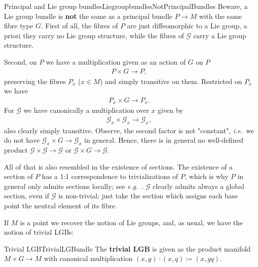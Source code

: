 \documentclass[reqno,a4paper,oneside]{amsart}
\newcounter{access}
\theoremstyle{plain}
\theoremstyle{remark}
\theoremstyle{definition}
\begin{document}
\ifnum{}
\begin{remarks}{Principal and Lie group bundles}{LiegroupbundlesNotPrincipalBundles}
Beware, a Lie group bundle is \textbf{not} the same as a principal bundle $P \to M$ with the same fibre type $G$. First of all, the fibres of $P$ are just diffeomorphic to a Lie group, a priori they carry no Lie group structure, while the fibres of $\mathcal{G}$ carry a Lie group structure.
\newline

Second, on $P$ we have a multiplication given as an action of $G$ on $P$
\begin{align*}
P \times G \to P,
\end{align*}
preserving the fibres $P_x$ ($x\in M$) and simply transitive on them. Restricted on $P_x$ we have
\begin{align*}
P_x \times G \to P_x.
\end{align*}
For $\mathcal{G}$ we have canonically a multiplication over $x$ given by
\begin{align*}
\mathcal{G}_x \times \mathcal{G}_x \to \mathcal{G}_x,
\end{align*}
also clearly simply transitive. Observe, the second factor is not "constant", \textit{i.e.}\ we do not have $\mathcal{G}_x \times G \to \mathcal{G}_x$ in general. Hence, there is in general no well-defined product $\mathcal{G} \times \mathcal{G} \to \mathcal{G}$ or $\mathcal{G} \times G \to \mathcal{G}$.
\newline

All of that is also resembled in the existence of sections. The existence of a section of $P$ has a 1:1 correspondence to trivializations of $P$, which is why $P$ in general only admits sections locally; see \textit{e.g.}\ \cite[\S 4.2, Thm.\ 4.2.19; page 219f.]{Hamilton}. $\mathcal{G}$ clearly admits always a global section, even if $\mathcal{G}$ is non-trivial; just take the section which assigns each base point the neutral element of its fibre.
\end{remarks}
\fi

If $M$ is a point we recover the notion of Lie groups, and, as usual, we have the notion of trivial LGBs:

\begin{examples}{Trivial LGB}{TrivialLGBundle}
The \textbf{trivial LGB} is given as the product manifold $M \times G \to M$ with canonical multiplication $(x, g) \cdot (x, q) \coloneqq (x, gq)$.
\end{examples}
\end{document}
